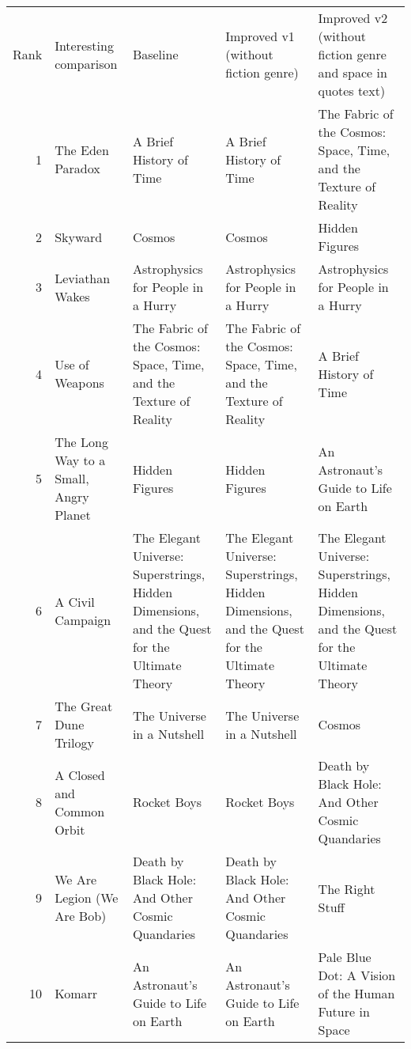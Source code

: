\begin{tabular}{rllll}
Rank & Interesting comparison & Baseline & Improved v1 (without fiction genre) & Improved v2 (without fiction genre and space in quotes text) \\
1 & The Eden Paradox & A Brief History of Time & A Brief History of Time & The Fabric of the Cosmos: Space, Time, and the Texture of Reality \\
2 & Skyward & Cosmos & Cosmos & Hidden Figures \\
3 & Leviathan Wakes & Astrophysics for People in a Hurry & Astrophysics for People in a Hurry & Astrophysics for People in a Hurry \\
4 & Use of Weapons & The Fabric of the Cosmos: Space, Time, and the Texture of Reality & The Fabric of the Cosmos: Space, Time, and the Texture of Reality & A Brief History of Time \\
5 & The Long Way to a Small, Angry Planet & Hidden Figures & Hidden Figures & An Astronaut's Guide to Life on Earth \\
6 & A Civil Campaign & The Elegant Universe: Superstrings, Hidden Dimensions, and the Quest for the Ultimate Theory & The Elegant Universe: Superstrings, Hidden Dimensions, and the Quest for the Ultimate Theory & The Elegant Universe: Superstrings, Hidden Dimensions, and the Quest for the Ultimate Theory \\
7 & The Great Dune Trilogy & The Universe in a Nutshell & The Universe in a Nutshell & Cosmos \\
8 & A Closed and Common Orbit & Rocket Boys & Rocket Boys & Death by Black Hole: And Other Cosmic Quandaries \\
9 & We Are Legion (We Are Bob) & Death by Black Hole: And Other Cosmic Quandaries & Death by Black Hole: And Other Cosmic Quandaries & The Right Stuff \\
10 & Komarr & An Astronaut's Guide to Life on Earth & An Astronaut's Guide to Life on Earth & Pale Blue Dot: A Vision of the Human Future in Space \\
\end{tabular}
